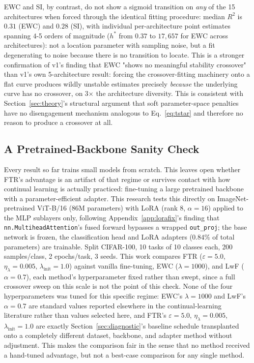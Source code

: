 \documentclass[11pt]{article}
\newcommand{\eps}{\varepsilon}
\begin{document}
EWC and SI, by contrast, do not show a sigmoid transition on \emph{any} of
the 15 architectures when forced through the identical fitting procedure:
median $R^2$ is $0.31$ (EWC) and $0.28$ (SI), with individual per-architecture
point estimates spanning 4-5 orders of magnitude ($h^*$ from $0.37$ to
$17{,}657$ for EWC across architectures): not a location parameter with
sampling noise, but a fit degenerating to noise because there is no
transition to locate. This is a stronger confirmation of v1's finding that
EWC "shows no meaningful stability crossover" than v1's own 5-architecture
result: forcing the crossover-fitting machinery onto a flat curve produces
wildly unstable estimates precisely \emph{because} the underlying curve has
no crossover, on 3$\times$ the architecture diversity. This is consistent
with Section~\ref{sec:theory}'s structural argument that soft
parameter-space penalties have no disengagement mechanism analogous to
Eq.~\ref{eq:tstar} and therefore no reason to produce a crossover at all.

\subsection{A Pretrained-Backbone Sanity Check}
\label{sec:pretrained}
Every result so far trains small models from scratch. This leaves open
whether FTR's advantage is an artifact of that regime or survives contact
with how continual learning is actually practiced: fine-tuning a large
pretrained backbone with a parameter-efficient adapter. This research tests this
directly on ImageNet-pretrained ViT-B/16 (86M parameters) with LoRA
(rank 8, $\alpha=16$) applied to the MLP sublayers only, following
Appendix~\ref{app:lorafix}'s finding that \texttt{nn.MultiheadAttention}'s
fused forward bypasses a wrapped \texttt{out\_proj}; the base network is
frozen, the classification head and LoRA adapters ($0.84\%$ of total
parameters) are trainable. Split CIFAR-100, 10 tasks of 10 classes each,
200 samples/class, 2 epochs/task, 3 seeds. This work compares FTR ($\eps=5.0$,
$\eta_\lambda=0.005$, $\lambda_{\mathrm{init}}=1.0$) against vanilla
fine-tuning, EWC ($\lambda=1000$), and LwF ($\alpha=0.7$), each method's
hyperparameter fixed rather than swept, since a full crossover sweep on
this scale is not the point of this check. None of the four
hyperparameters was tuned for this specific regime: EWC's
$\lambda=1000$ and LwF's $\alpha=0.7$ are standard values reported
elsewhere in the continual-learning literature rather than values
selected here, and FTR's $\eps=5.0$, $\eta_\lambda=0.005$,
$\lambda_{\mathrm{init}}=1.0$ are exactly Section~\ref{sec:diagnostic}'s
baseline schedule transplanted onto a completely different dataset,
backbone, and adapter method without adjustment. This makes the comparison
fair in the sense that no method received a hand-tuned advantage, but not
a best-case comparison for any single method.
\end{document}
